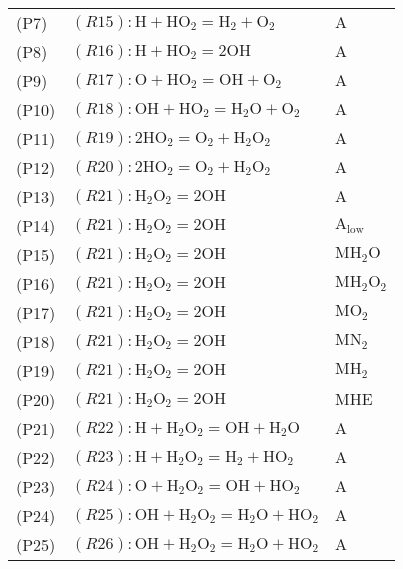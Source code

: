 \documentclass[preprint,3p,times,twocolumn]{elsarticle}
\begin{document}
\begin{itemize}
\begin{table}[htp]
\begin{tabular}{l l l}
(P7)&$ (R15): \mathrm{H} + \mathrm{HO}_2 = \mathrm{H}_2 + \mathrm{O}_2     $&$ \mathrm{A}$\\
(P8)&$ (R16): \mathrm{H} + \mathrm{HO}_2 = 2\mathrm{OH}     $&$ \mathrm{A}$\\
(P9)&$ (R17): \mathrm{O} + \mathrm{HO}_2 = \mathrm{OH} + \mathrm{O}_2     $&$ \mathrm{A}$\\
(P10)&$ (R18): \mathrm{OH} + \mathrm{HO}_2 = \mathrm{H}_2\mathrm{O} + \mathrm{O}_2     $&$ \mathrm{A}$\\
(P11)&$ (R19): 2\mathrm{HO}_2 = \mathrm{O}_2 + \mathrm{H}_2\mathrm{O}_2     $&$ \mathrm{A}$\\
(P12)&$ (R20): 2\mathrm{HO}_2 = \mathrm{O}_2 + \mathrm{H}_2\mathrm{O}_2     $&$ \mathrm{A}$\\
(P13)&$ (R21): \mathrm{H}_2\mathrm{O}_2 = 2\mathrm{OH}     $&$ \mathrm{A}$\\
(P14)&$ (R21): \mathrm{H}_2\mathrm{O}_2 = 2\mathrm{OH}     $&$ \mathrm{A}_\mathrm{low}$\\
(P15)&$ (R21): \mathrm{H}_2\mathrm{O}_2 = 2\mathrm{OH}     $&$ \mathrm{M} \mathrm{H}_2\mathrm{O}$\\
(P16)&$ (R21): \mathrm{H}_2\mathrm{O}_2 = 2\mathrm{OH}     $&$ \mathrm{M} \mathrm{H}_2\mathrm{O}_2$\\
(P17)&$ (R21): \mathrm{H}_2\mathrm{O}_2 = 2\mathrm{OH}     $&$ \mathrm{M} \mathrm{O}_2$\\
(P18)&$ (R21): \mathrm{H}_2\mathrm{O}_2 = 2\mathrm{OH}     $&$ \mathrm{M} \mathrm{N}_2$\\
(P19)&$ (R21): \mathrm{H}_2\mathrm{O}_2 = 2\mathrm{OH}     $&$ \mathrm{M} \mathrm{H}_2$\\
(P20)&$ (R21): \mathrm{H}_2\mathrm{O}_2 = 2\mathrm{OH}     $&$ \mathrm{M} \mathrm{HE}$\\
(P21)&$ (R22): \mathrm{H} + \mathrm{H}_2\mathrm{O}_2 = \mathrm{OH} + \mathrm{H}_2\mathrm{O}     $&$ \mathrm{A}$\\
(P22)&$ (R23): \mathrm{H} + \mathrm{H}_2\mathrm{O}_2 = \mathrm{H}_2 + \mathrm{HO}_2     $&$ \mathrm{A}$\\
(P23)&$ (R24): \mathrm{O} + \mathrm{H}_2\mathrm{O}_2 = \mathrm{OH} + \mathrm{HO}_2     $&$ \mathrm{A}$\\
(P24)&$ (R25): \mathrm{OH} + \mathrm{H}_2\mathrm{O}_2 = \mathrm{H}_2\mathrm{O} + \mathrm{HO}_2     $&$ \mathrm{A}$\\
(P25)&$ (R26): \mathrm{OH} + \mathrm{H}_2\mathrm{O}_2 = \mathrm{H}_2\mathrm{O} + \mathrm{HO}_2     $&$ \mathrm{A}$\\

\end{tabular}
\end{table}
\end{itemize}
\end{document}
